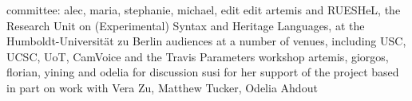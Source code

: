 \addchap{\lsAcknowledgementTitle} 

committee: alec, maria, stephanie, michael, edit
edit
artemis and RUESHeL, the Research Unit on (Experimental) Syntax and Heritage Languages, at the Humboldt-Universit\"at zu Berlin
audiences at a number of venues, including USC, UCSC, UoT, CamVoice and the Travis Parameters workshop
artemis, giorgos, florian, yining and odelia for discussion
susi for her support of the project
based in part on work with Vera Zu, Matthew Tucker, Odelia Ahdout
